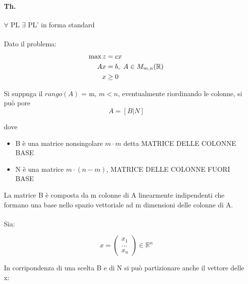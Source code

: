 \documentclass[a4paper, 11pt]{article}
\begin{document}
            \paragraph{Th. } $\forall$ PL $\exists$ PL' in forma standard

            \paragraph{}
            Dato il problema: 
            \begin{align}
                \max{z} &= cx \notag \\
                 Ax &= b, \text{ } A \in M_{m,n}(\mathbb{R}) \notag \\
                 x & \geq 0 \notag 
            \end{align}
            
            Si suppnga il $rango(A)$ = m, $m < n$, eventualmente riordinando le colonne, si può pore 
            \[
                A = [B|N]
            \]

            dove 
            \begin{itemize}
                \item B è una matrice nonsingolare $m \cdot m$ detta MATRICE DELLE COLONNE BASE 
                \item N è una matrice $m \cdot (n-m)$, MATRICE DELLE COLONNE FUORI BASE
            \end{itemize}

            La matrice B è composta da m colonne di A linearmente indipendenti che formano 
            una base nello spazio vettoriale ad m dimensioni delle colonne di A.



            \paragraph{}
            Sia:


            \[
                x = 
                \begin{pmatrix}
                    x_1 \\
                    \ldots \\
                    x_n
                \end{pmatrix}
                \in \mathbb{R}^n
            \]

            In corripondenza di una scelta B e di N si può partizionare anche il vettore delle x:
\end{document}
